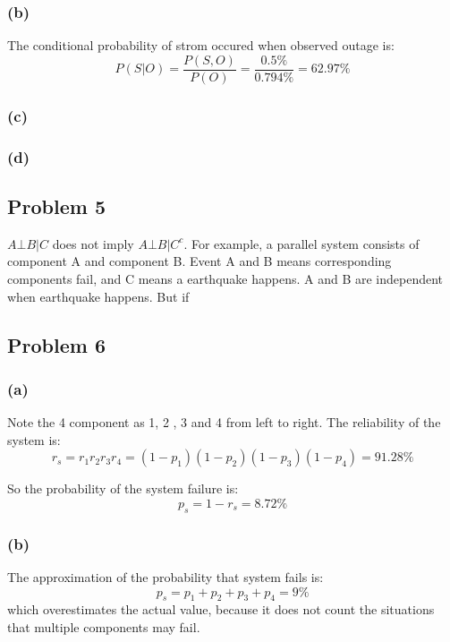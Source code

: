 \documentclass[a4paper]{article}
\begin{document}
\subsubsection{(b)}
The conditional probability of strom occured when observed outage is:
\begin{equation}
	P(S|O)=\frac{P(S,O)}{P(O)}=\frac{0.5 \%}{0.794 \%}=62.97 \%
\end{equation}
\subsubsection{(c)}
\subsubsection{(d)}

\subsection{Problem 5}
$A \bot B|C$ does not imply $A \bot B|C^{c}$. For example, a parallel system consists of component A and component B. Event A and B means corresponding components fail, and C means a earthquake happens. A and B are independent when earthquake happens. But if 

\subsection{Problem 6}
\subsubsection{(a)}
Note the 4 component as 1, 2 , 3 and 4 from left to right. The reliability of the system is: 
\begin{equation}
	r_{s} = r_{1}r_{2}r_{3}r_{4}=(1-p_{1})(1-p_{2})(1-p_{3})(1-p_{4})=91.28\%
\end{equation}

So the probability of the system failure is:
\begin{equation}
	p_{s}=1-r_{s}=8.72\%
\end{equation}

\subsubsection{(b)}
The approximation of the probability that system fails is:
\begin{equation}
	p_{s}=p_{1}+p_{2}+p_{3}+p_{4}=9\%
\end{equation}
which overestimates the actual value, because it does not count the situations that multiple components may fail.
\end{document}
